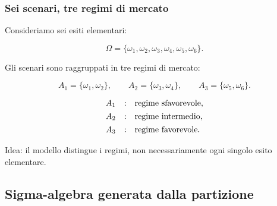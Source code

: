 \documentclass[handout]{beamer}%
\providecommand{\1}{\mathbf{1}}
\providecommand{\QTR}[2]{\csname #1\endcsname{#2}}
\begin{document}
\begin{frame}%
%

\frametitle{Sei scenari, tre regimi di mercato}%


Consideriamo sei esiti elementari:%

\[
\Omega=\{\omega_{1},\omega_{2},\omega_{3},\omega_{4},\omega_{5},\omega_{6}\}.
\]


\medskip

Gli scenari sono raggruppati in tre regimi di mercato:%

\[
A_{1}=\{\omega_{1},\omega_{2}\}, \qquad A_{2}=\{\omega_{3},\omega_{4}\},
\qquad A_{3}=\{\omega_{5},\omega_{6}\}.
\]


\medskip%

\[%
\begin{array}
[c]{rcl}%
A_{1} & : & \mbox{regime sfavorevole},\\[4pt]%
A_{2} & : & \mbox{regime intermedio},\\[4pt]%
A_{3} & : & \mbox{regime favorevole}.
\end{array}
\]


\medskip

Idea: il modello distingue i regimi, non necessariamente ogni singolo esito elementare.%

\transboxout
\end{frame}%




\subsection{Sigma-algebra generata dalla partizione}%
\end{document}
